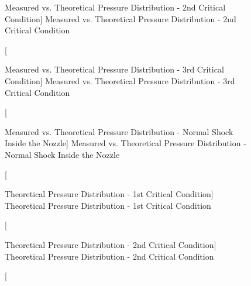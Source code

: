 \begin{figure}[htpb]
    \centering
     
     \caption
     [Measured vs. Theoretical Pressure Distribution - 2nd Critical Condition]
     {Measured vs. Theoretical Pressure Distribution - 2nd Critical Condition}
     \label{fig: MeasuredvsTheoreticalPressureDistribution2ndCriticalCondition}
\end{figure}

\begin{figure}[htpb]
    \centering
     
     \caption
     [Measured vs. Theoretical Pressure Distribution - 3rd Critical Condition]
     {Measured vs. Theoretical Pressure Distribution - 3rd Critical Condition}
     \label{fig: MeasuredvsTheoreticalPressureDistribution3rdCriticalCondition}
\end{figure}

\begin{figure}[htpb]
    \centering
     
     \caption
     [Measured vs. Theoretical Pressure Distribution - Normal Shock Inside the Nozzle]
     {Measured vs. Theoretical Pressure Distribution - Normal Shock Inside the Nozzle}
     \label{fig: MeasuredvsTheoreticalPressureDistributionNormalShockInsidetheNozzle}
\end{figure}

\begin{figure}[htpb]
    \centering
     
     \caption
     [Theoretical Pressure Distribution - 1st Critical Condition]
     {Theoretical Pressure Distribution - 1st Critical Condition}
     \label{fig: TheoreticalPressureDistribution1stCriticalCondition}
\end{figure}

\begin{figure}[htpb]
    \centering
     
     \caption
     [Theoretical Pressure Distribution - 2nd Critical Condition]
     {Theoretical Pressure Distribution - 2nd Critical Condition}
     \label{fig: TheoreticalPressureDistribution2ndCriticalCondition}
\end{figure}

